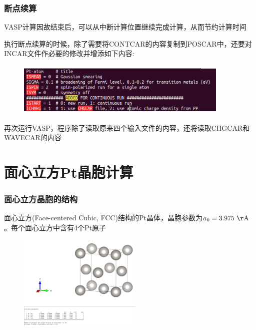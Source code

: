 \frame
{
	\frametitle{断点续算}
\textrm{VASP}计算因故结束后，可以从中断计算位置继续完成计算，从而节约计算时间

执行断点续算的时候，除了需要将\textrm{CONTCAR}的内容复制到\textrm{POSCAR}中，还要对\textrm{INCAR}文件作必要的修改并增添如下内容:
\begin{figure}[h!]
\centering
\vskip -5pt
\includegraphics[height=1.0in,width=4.0in,viewport=0 0 700 157,clip]{Figures/Pt_atom-continurun.png}
\caption{\fontsize{6.2pt}{5.2pt}}%
\label{Pt_atom:continuruntime}
\end{figure}
再次运行\textrm{VASP}，程序除了读取原来四个输入文件的内容，还将读取\textrm{CHGCAR}和\textrm{WAVECAR}的内容%
}
\section{面心立方{\rm Pt}晶胞计算}\label{Sec:FCC-Pt}
\frame
{
	\frametitle{面心立方晶胞的结构}
	面心立方\textrm{(Face-centered Cubic, FCC)}结构的\textrm{Pt}晶体，晶胞参数为$a_0=3.975~\mathrm{\AA}$。每个面心立方中含有4个\textrm{Pt}原子
\begin{figure}[h!]
\centering
\includegraphics[height=1.8in,viewport=350 210 840 640,clip]{Figures/VASP_train-FCC.png}
\caption{\fontsize{6.2pt}{5.2pt}}%
\label{Pt_FCC:structure}
\end{figure}
}

